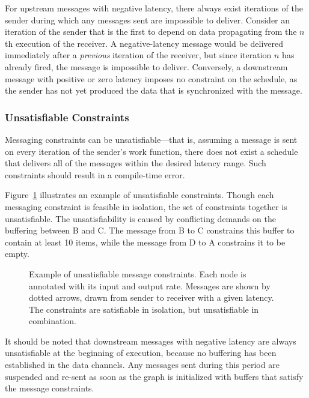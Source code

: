 For upstream messages with negative latency, there always exist
iterations of the sender during which any messages sent are
impossible to deliver.  Consider an iteration of the sender that is
the first to depend on data propagating from the $n$th execution of
the receiver.  A negative-latency message would be delivered
immediately after a {\it previous} iteration of the receiver, but
since iteration $n$ has already fired, the message is impossible to
deliver.  Conversely, a downstream message with positive or zero
latency imposes no constraint on the schedule, as the sender has not
yet produced the data that is synchronized with the message.

\subsubsection*{Unsatisfiable Constraints}  
Messaging constraints can be unsatisfiable---that is, assuming a
message is sent on every iteration of the sender's work function,
there does not exist a schedule that delivers all of the messages
within the desired latency range.  Such constraints should result in a
compile-time error.  

Figure~\ref{fig:infeasible} illustrates an example of unsatisfiable
constraints.  Though each messaging constraint is feasible in
isolation, the set of constraints together is unsatisfiable.  The
unsatisfiability is caused by conflicting demands on the buffering
between B and C.  The message from B to C constrains this buffer to
contain at least 10 items, while the message from D to A constrains it
to be empty.
\begin{figure}[t]
\begin{center}
\vspace{-8pt}
\caption[Example of unsatisfiable message constraints]{Example of
  unsatisfiable message constraints.  Each node is annotated with its
  input and output rate.  Messages are shown by dotted arrows, drawn
  from sender to receiver with a given latency.  The constraints are
  satisfiable in isolation, but unsatisfiable in combination.
  \protect\label{fig:infeasible}}
\end{center}
\vspace{-13pt}
\end{figure}

It should be noted that downstream messages with negative latency are
always unsatisfiable at the beginning of execution, because no
buffering has been established in the data channels.  Any messages
sent during this period are suspended and re-sent as soon as the graph
is initialized with buffers that satisfy the message constraints.

